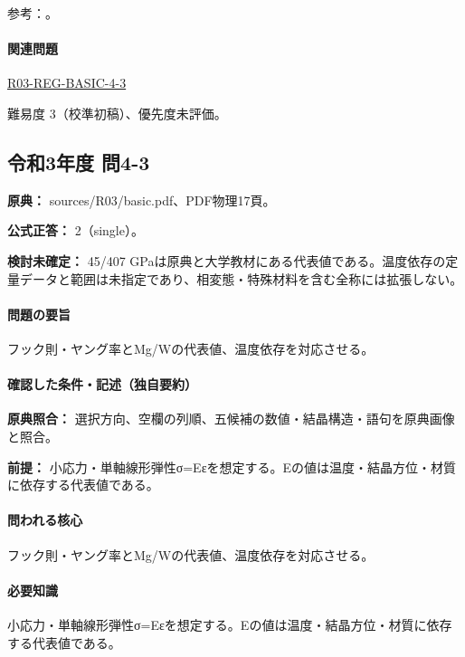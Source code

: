 \par 参考：\cite{mit_material_elastic2000,princeton_magnesium,princeton_tungsten}。

\paragraph{関連問題} \hyperref[q:r03-reg-basic-4-3]{R03-REG-BASIC-4-3}

\par 難易度 3（校準初稿）、優先度未評価。

\subsection{令和3年度 問4-3}
\label{q:r03-reg-basic-4-3}

\noindent\textbf{原典：} sources/R03/basic.pdf、PDF物理17頁。

\textbf{公式正答：} 2（single）。

\par\textbf{検討未確定：} 45/407 GPaは原典と大学教材にある代表値である。温度依存の定量データと範囲は未指定であり、相変態・特殊材料を含む全称には拡張しない。

\paragraph{問題の要旨} フック則・ヤング率とMg/Wの代表値、温度依存を対応させる。

\paragraph{確認した条件・記述（独自要約）}\mbox{}\par

\noindent\textbf{原典照合：} 選択方向、空欄の列順、五候補の数値・結晶構造・語句を原典画像と照合。\par

\noindent\textbf{前提：} 小応力・単軸線形弾性σ=Eεを想定する。Eの値は温度・結晶方位・材質に依存する代表値である。\par

\paragraph{問われる核心} フック則・ヤング率とMg/Wの代表値、温度依存を対応させる。

\paragraph{必要知識} 小応力・単軸線形弾性σ=Eεを想定する。Eの値は温度・結晶方位・材質に依存する代表値である。

